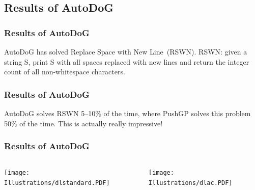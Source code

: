 \documentclass{beamer}
\newcommand{\linespace}{\vskip 0.25cm}
\begin{document}
\begin{frame}
\end{frame}

\subsection{Results of AutoDoG}

\begin{frame}
	\frametitle{Results of AutoDoG}
	AutoDoG has solved Replace Space with New Line~(RSWN).
	\linespace
	\linespace
	\pause
	RSWN: given a string S, print S with all spaces replaced with new lines and return the integer count of all non-whitespace characters.
\end{frame}

\begin{frame}
	\frametitle{Results of AutoDoG}
	AutoDoG solves RSWN 5--10\% of the time, where PushGP solves this problem 50\% of the time.
	\linespace
	\linespace
	\pause
	\centering
	This is actually really impressive!
\end{frame}

\begin{frame}
	\frametitle{Results of AutoDoG}
	\begin{columns}
		\begin{column}{.5\textwidth}
			\texttt{[image: Illustrations/dlstandard.PDF]}
		\end{column}
		\begin{column}{.5\textwidth}
			\texttt{[image: Illustrations/dlac.PDF]}
		\end{column}
	\end{columns}
	\linespace
	\centering
\end{frame}
\end{document}
